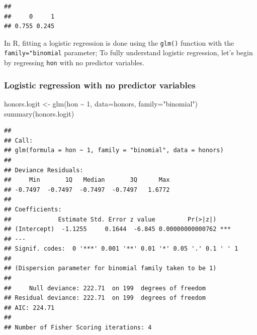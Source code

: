 \documentclass[
]{article}
\newenvironment{Shaded}{\begin{snugshade}}{\end{snugshade}}
\newcommand{\AttributeTok}[1]{\textcolor[rgb]{0.77,0.63,0.00}{#1}}
\newcommand{\DecValTok}[1]{\textcolor[rgb]{0.00,0.00,0.81}{#1}}
\newcommand{\FunctionTok}[1]{\textcolor[rgb]{0.00,0.00,0.00}{#1}}
\newcommand{\NormalTok}[1]{#1}
\newcommand{\OtherTok}[1]{\textcolor[rgb]{0.56,0.35,0.01}{#1}}
\newcommand{\SpecialCharTok}[1]{\textcolor[rgb]{0.00,0.00,0.00}{#1}}
\newcommand{\StringTok}[1]{\textcolor[rgb]{0.31,0.60,0.02}{#1}}
\begin{document}
\begin{Shaded}
\end{Shaded}

\begin{verbatim}
## 
##     0     1 
## 0.755 0.245
\end{verbatim}

In R, fitting a logistic regression is done using the \texttt{glm()}
function with the \texttt{family="binomial} parameter; To fully
understand logistic regression, let's begin by regressing \texttt{hon}
with no predictor variables.

\hypertarget{logistic-regression-with-no-predictor-variables}{%
\subsubsection{Logistic regression with no predictor
variables}\label{logistic-regression-with-no-predictor-variables}}

\begin{Shaded}
\begin{Highlighting}[]
\NormalTok{honors.logit }\OtherTok{\textless{}{-}} \FunctionTok{glm}\NormalTok{(hon }\SpecialCharTok{\textasciitilde{}} \DecValTok{1}\NormalTok{, }\AttributeTok{data=}\NormalTok{honors, }\AttributeTok{family=}\StringTok{"binomial"}\NormalTok{) }
\FunctionTok{summary}\NormalTok{(honors.logit)}
\end{Highlighting}
\end{Shaded}

\begin{verbatim}
## 
## Call:
## glm(formula = hon ~ 1, family = "binomial", data = honors)
## 
## Deviance Residuals: 
##     Min       1Q   Median       3Q      Max  
## -0.7497  -0.7497  -0.7497  -0.7497   1.6772  
## 
## Coefficients:
##             Estimate Std. Error z value         Pr(>|z|)    
## (Intercept)  -1.1255     0.1644  -6.845 0.00000000000762 ***
## ---
## Signif. codes:  0 '***' 0.001 '**' 0.01 '*' 0.05 '.' 0.1 ' ' 1
## 
## (Dispersion parameter for binomial family taken to be 1)
## 
##     Null deviance: 222.71  on 199  degrees of freedom
## Residual deviance: 222.71  on 199  degrees of freedom
## AIC: 224.71
## 
## Number of Fisher Scoring iterations: 4
\end{verbatim}
\end{document}
